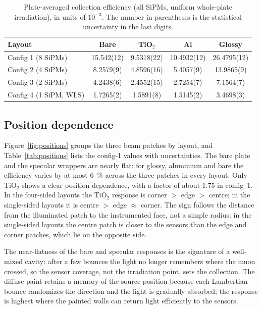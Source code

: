\documentclass[preprint,12pt]{elsarticle}
\begin{document}
\begin{table}[htbp]
\centering
\caption{Plate-averaged collection efficiency (all SiPMs, uniform whole-plate
irradiation), in units of $10^{-3}$. The number in parentheses is the
statistical uncertainty in the last digits.}
\label{tab:eff}
\small
\begin{tabular}{@{}lcccc@{}}
\toprule
Layout & Bare & TiO$_2$ & Al & Glossy \\
\midrule
Config 1 (8 SiPMs)     & 15.542(12) & 9.5318(22) & 10.4932(12) & 26.4795(12) \\
Config 2 (4 SiPMs)     & 8.2579(9)  & 4.8596(16) & 5.4057(9)   & 13.9865(9)  \\
Config 3 (2 SiPMs)     & 4.2438(6)  & 2.4552(15) & 2.7254(7)   & 7.1564(7)   \\
Config 4 (1 SiPM, WLS) & 1.7265(2)  & 1.5891(8)  & 1.5145(2)   & 3.4698(3)   \\
\bottomrule
\end{tabular}
\end{table}

\subsection{Position dependence}

Figure~\ref{fig:positions} groups the three beam patches by layout, and
Table~\ref{tab:positions} lists the config-1 values with uncertainties. The bare
plate and the specular wrappers are nearly flat: for glossy, aluminium and bare
the efficiency varies by at most \SI{6}{\percent} across the three patches in
every layout. Only TiO$_2$ shows a clear position dependence, with a factor of
about \num{1.75} in config~1. In the four-sided layouts the TiO$_2$ response is
corner $>$ edge $>$ centre; in the single-sided layouts it is centre $>$ edge
$\approx$ corner. The sign follows the distance from the illuminated patch to
the instrumented face, not a simple radius: in the single-sided layouts the
centre patch is closer to the sensors than the edge and corner patches, which
lie on the opposite side.

The near-flatness of the bare and specular responses is the signature of a
well-mixed cavity: after a few bounces the light no longer remembers where the
muon crossed, so the sensor coverage, not the irradiation point, sets the
collection. The diffuse paint retains a memory of the source position because
each Lambertian bounce randomizes the direction and the light is gradually
absorbed; the response is highest where the painted walls can return light
efficiently to the sensors.
\end{document}
